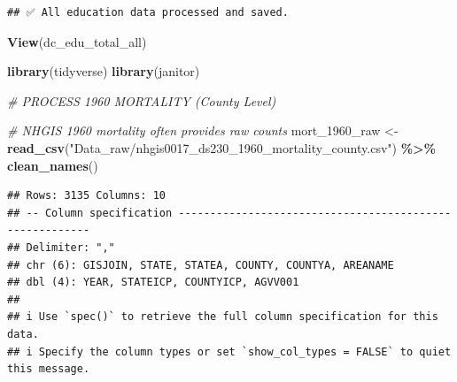 \documentclass[
]{article}
\newenvironment{Shaded}{\begin{snugshade}}{\end{snugshade}}
\newcommand{\CommentTok}[1]{\textcolor[rgb]{0.56,0.35,0.01}{\textit{#1}}}
\newcommand{\FunctionTok}[1]{\textcolor[rgb]{0.13,0.29,0.53}{\textbf{#1}}}
\newcommand{\NormalTok}[1]{#1}
\newcommand{\OtherTok}[1]{\textcolor[rgb]{0.56,0.35,0.01}{#1}}
\newcommand{\SpecialCharTok}[1]{\textcolor[rgb]{0.81,0.36,0.00}{\textbf{#1}}}
\newcommand{\StringTok}[1]{\textcolor[rgb]{0.31,0.60,0.02}{#1}}
\begin{document}
\begin{verbatim}
## ✅ All education data processed and saved.
\end{verbatim}

\begin{Shaded}
\begin{Highlighting}[]
\FunctionTok{View}\NormalTok{(dc\_edu\_total\_all)}
\end{Highlighting}
\end{Shaded}

\begin{Shaded}
\begin{Highlighting}[]
\FunctionTok{library}\NormalTok{(tidyverse)}
\FunctionTok{library}\NormalTok{(janitor)}


\CommentTok{\# PROCESS 1960 MORTALITY (County Level)}

\CommentTok{\# NHGIS 1960 mortality often provides raw counts}
\NormalTok{mort\_1960\_raw }\OtherTok{\textless{}{-}} \FunctionTok{read\_csv}\NormalTok{(}\StringTok{"Data\_raw/nhgis0017\_ds230\_1960\_mortality\_county.csv"}\NormalTok{) }\SpecialCharTok{\%\textgreater{}\%}
  \FunctionTok{clean\_names}\NormalTok{()}
\end{Highlighting}
\end{Shaded}

\begin{verbatim}
## Rows: 3135 Columns: 10
## -- Column specification --------------------------------------------------------
## Delimiter: ","
## chr (6): GISJOIN, STATE, STATEA, COUNTY, COUNTYA, AREANAME
## dbl (4): YEAR, STATEICP, COUNTYICP, AGVV001
## 
## i Use `spec()` to retrieve the full column specification for this data.
## i Specify the column types or set `show_col_types = FALSE` to quiet this message.
\end{verbatim}
\end{document}
